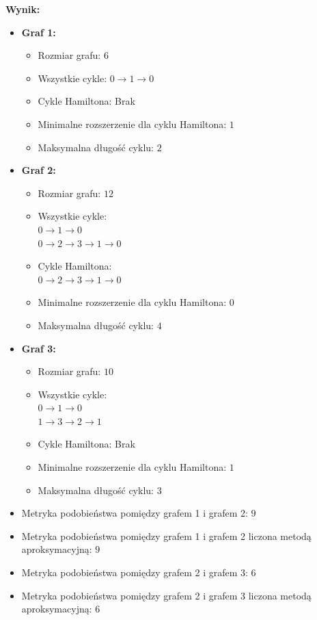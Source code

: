 \noindent \textbf{Wynik:}
\begin{itemize}
    \item \textbf{Graf 1:}
    \begin{itemize}
        \item Rozmiar grafu: \(6\)
        \item Wszystkie cykle: \(0 \to 1 \to 0\)
        \item Cykle Hamiltona: Brak
        \item Minimalne rozszerzenie dla cyklu Hamiltona: \(1\)
        \item Maksymalna długość cyklu: \(2\)
    \end{itemize}
    \item \textbf{Graf 2:}
    \begin{itemize}
        \item Rozmiar grafu: \(12\)
        \item Wszystkie cykle:
        		\\ \(0 \to 1 \to 0\)
    			\\ \(0 \to 2 \to 3 \to 1 \to 0\)  
        \item Cykle Hamiltona:
    			\\ \(0 \to 2 \to 3 \to 1 \to 0\)
        \item Minimalne rozszerzenie dla cyklu Hamiltona: \(0\)
        \item Maksymalna długość cyklu: \(4\)
    \end{itemize}
    \item \textbf{Graf 3:}
    \begin{itemize}
        \item Rozmiar grafu: \(10\)
        \item Wszystkie cykle:
        		\\ \(0 \to 1 \to 0\)
    			\\ \(1 \to 3 \to 2 \to 1\)   
        \item Cykle Hamiltona: Brak
        \item Minimalne rozszerzenie dla cyklu Hamiltona: \(1\)
        \item Maksymalna długość cyklu: \(3\)
    \end{itemize}
    \item Metryka podobieństwa pomiędzy grafem 1 i grafem 2: \(9\)
    \item Metryka podobieństwa pomiędzy grafem 1 i grafem 2 liczona metodą aproksymacyjną: \(9\)
    \item Metryka podobieństwa pomiędzy grafem 2 i grafem 3: \(6\)
    \item Metryka podobieństwa pomiędzy grafem 2 i grafem 3 liczona metodą aproksymacyjną: \(6\)
\end{itemize}

